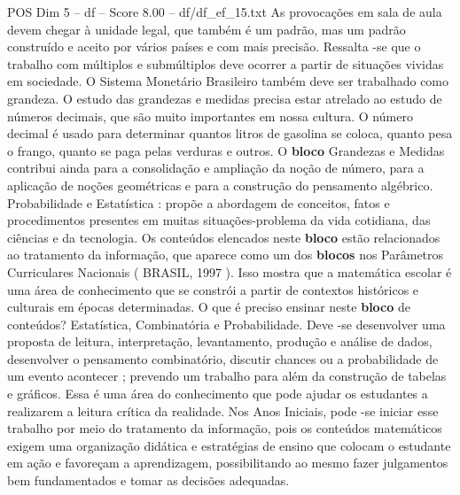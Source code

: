 \begin{textsample}{POS Dim 5 – df – Score 8.00 – df/df\_ef\_15.txt}
As provocações em sala de aula devem chegar à unidade legal, que também é um padrão, mas um padrão construído e aceito por vários países e com mais precisão.
Ressalta -se que o trabalho com múltiplos e submúltiplos deve ocorrer a partir de situações vividas em sociedade.
O Sistema Monetário Brasileiro também deve ser trabalhado como grandeza.
O estudo das grandezas e medidas precisa estar atrelado ao estudo de números decimais, que são muito importantes em nossa cultura.
O número decimal é usado para determinar quantos litros de gasolina se coloca, quanto pesa o frango, quanto se paga pelas verduras e outros.
O \textbf{bloco} Grandezas e Medidas contribui ainda para a consolidação e ampliação da noção de número, para a aplicação de noções geométricas e para a construção do pensamento algébrico.
Probabilidade e Estatística : propõe a abordagem de conceitos, fatos e procedimentos presentes em muitas situações-problema da vida cotidiana, das ciências e da tecnologia.
Os conteúdos elencados neste \textbf{bloco} estão relacionados ao tratamento da informação, que aparece como um dos \textbf{blocos} nos Parâmetros Curriculares Nacionais ( BRASIL, 1997 ).
Isso mostra que a matemática escolar é uma área de conhecimento que se constrói a partir de contextos históricos e culturais em épocas determinadas.
O que é preciso ensinar neste \textbf{bloco} de conteúdos?
Estatística, Combinatória e Probabilidade.
Deve -se desenvolver uma proposta de leitura, interpretação, levantamento, produção e análise de dados, desenvolver o pensamento combinatório, discutir chances ou a probabilidade de um evento acontecer ; prevendo um trabalho para além da construção de tabelas e gráficos.
Essa é uma área do conhecimento que pode ajudar os estudantes a realizarem a leitura crítica da realidade.
Nos Anos Iniciais, pode -se iniciar esse trabalho por meio do tratamento da informação, pois os conteúdos matemáticos exigem uma organização didática e estratégias de ensino que colocam o estudante em ação e favoreçam a aprendizagem, possibilitando ao mesmo fazer julgamentos bem fundamentados e tomar as decisões adequadas.

\end{textsample}
